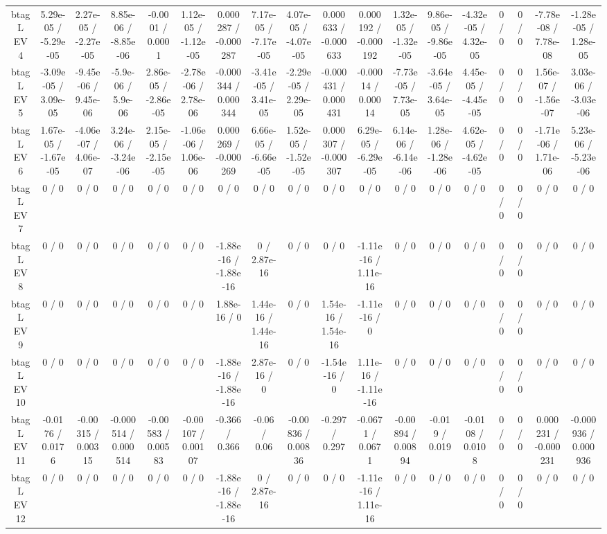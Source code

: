 \documentclass[10pt]{article}
\begin{document}
\begin{table}[htbp]
\begin{center}
\begin{tabular}{|c|c|c|c|c|c|c|c|c|c|c|c|c|c|c|c|c|c|}
  btag L EV 4 & 5.29e-05 / -5.29e-05 & 2.27e-05 / -2.27e-05 & 8.85e-06 / -8.85e-06 & -0.0001 / 0.0001 & 1.12e-05 / -1.12e-05 & 0.000287 / -0.000287 & 7.17e-05 / -7.17e-05 & 4.07e-05 / -4.07e-05 & 0.000633 / -0.000633 & 0.000192 / -0.000192 & 1.32e-05 / -1.32e-05 & 9.86e-05 / -9.86e-05 & -4.32e-05 / 4.32e-05 & 0 / 0 & 0 / 0 & -7.78e-08 / 7.78e-08 & -1.28e-05 / 1.28e-05 \\ 
  btag L EV 5 & -3.09e-05 / 3.09e-05 & -9.45e-06 / 9.45e-06 & -5.9e-06 / 5.9e-06 & 2.86e-05 / -2.86e-05 & -2.78e-06 / 2.78e-06 & -0.000344 / 0.000344 & -3.41e-05 / 3.41e-05 & -2.29e-05 / 2.29e-05 & -0.000431 / 0.000431 & -0.00014 / 0.00014 & -7.73e-05 / 7.73e-05 & -3.64e-05 / 3.64e-05 & 4.45e-05 / -4.45e-05 & 0 / 0 & 0 / 0 & 1.56e-07 / -1.56e-07 & 3.03e-06 / -3.03e-06 \\ 
  btag L EV 6 & 1.67e-05 / -1.67e-05 & -4.06e-07 / 4.06e-07 & 3.24e-06 / -3.24e-06 & 2.15e-05 / -2.15e-05 & -1.06e-06 / 1.06e-06 & 0.000269 / -0.000269 & 6.66e-05 / -6.66e-05 & 1.52e-05 / -1.52e-05 & 0.000307 / -0.000307 & 6.29e-05 / -6.29e-05 & 6.14e-06 / -6.14e-06 & 1.28e-06 / -1.28e-06 & 4.62e-05 / -4.62e-05 & 0 / 0 & 0 / 0 & -1.71e-06 / 1.71e-06 & 5.23e-06 / -5.23e-06 \\ 
  btag L EV 7 & 0 / 0 & 0 / 0 & 0 / 0 & 0 / 0 & 0 / 0 & 0 / 0 & 0 / 0 & 0 / 0 & 0 / 0 & 0 / 0 & 0 / 0 & 0 / 0 & 0 / 0 & 0 / 0 & 0 / 0 & 0 / 0 & 0 / 0 \\ 
  btag L EV 8 & 0 / 0 & 0 / 0 & 0 / 0 & 0 / 0 & 0 / 0 & -1.88e-16 / -1.88e-16 & 0 / 2.87e-16 & 0 / 0 & 0 / 0 & -1.11e-16 / 1.11e-16 & 0 / 0 & 0 / 0 & 0 / 0 & 0 / 0 & 0 / 0 & 0 / 0 & 0 / 0 \\ 
  btag L EV 9 & 0 / 0 & 0 / 0 & 0 / 0 & 0 / 0 & 0 / 0 & 1.88e-16 / 0 & 1.44e-16 / 1.44e-16 & 0 / 0 & 1.54e-16 / 1.54e-16 & -1.11e-16 / 0 & 0 / 0 & 0 / 0 & 0 / 0 & 0 / 0 & 0 / 0 & 0 / 0 & 0 / 0 \\ 
  btag L EV 10 & 0 / 0 & 0 / 0 & 0 / 0 & 0 / 0 & 0 / 0 & -1.88e-16 / -1.88e-16 & 2.87e-16 / 0 & 0 / 0 & -1.54e-16 / 0 & 1.11e-16 / -1.11e-16 & 0 / 0 & 0 / 0 & 0 / 0 & 0 / 0 & 0 / 0 & 0 / 0 & 0 / 0 \\ 
  btag L EV 11 & -0.0176 / 0.0176 & -0.00315 / 0.00315 & -0.000514 / 0.000514 & -0.00583 / 0.00583 & -0.00107 / 0.00107 & -0.366 / 0.366 & -0.06 / 0.06 & -0.00836 / 0.00836 & -0.297 / 0.297 & -0.0671 / 0.0671 & -0.00894 / 0.00894 & -0.019 / 0.019 & -0.0108 / 0.0108 & 0 / 0 & 0 / 0 & 0.000231 / -0.000231 & -0.000936 / 0.000936 \\ 
  btag L EV 12 & 0 / 0 & 0 / 0 & 0 / 0 & 0 / 0 & 0 / 0 & -1.88e-16 / -1.88e-16 & 0 / 2.87e-16 & 0 / 0 & 0 / 0 & -1.11e-16 / 1.11e-16 & 0 / 0 & 0 / 0 & 0 / 0 & 0 / 0 & 0 / 0 & 0 / 0 & 0 / 0 \\ 

\end{tabular}
\end{center}
\end{table}
\end{document}
